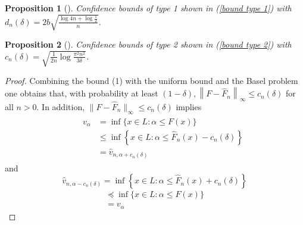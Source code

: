 \documentclass{article}
\theoremstyle{plain}
\newtheorem{prop}{Proposition}
\begin{document}
\begin{prop}[\textcite{cassel_general_2018}]
Confidence bounds of type 1 shown in (\ref{bound type 1}) with $d_n(\delta) = 2b \sqrt{\frac{\log 4n + \log \frac{1}{\delta}}{n}}$.

\end{prop}


\begin{prop}[\textcite{szorenyi_qualitative_nodate}] Confidence bounds of type 2 shown in (\ref{bound type 2}) with $c_n(\delta) = \sqrt{\frac{1}{2n} \log \frac{\pi^2 n^2}{3 \delta}}$. 
\end{prop}

\begin{proof}
 Combining the bound (1) with the uniform bound and the Basel problem one obtains that, with probability at least $(1-\delta),\left\|F-\widehat{F}_{n}\right\|_{\infty} \leq c_{n}(\delta)$ for all $n>0 .$ In addition, $\| F -\widehat{F}_{n} \|_{\infty} \leq c_{n}(\delta)$ implies\\
$$
\begin{aligned}
\qquad \begin{aligned}
v_\alpha &=\inf \{x \in L: \alpha \leq F(x)\} \\
& \leq \inf \left\{x \in L: \alpha \leq \widehat{F}_{n}(x)-c_{n}(\delta)\right\} \\
&=\widehat{v}_{n, \alpha+c_{n}(\delta)}
\end{aligned}
\end{aligned}
$$
and
$$
\widehat{v}_{n, \alpha-c_{n}(\delta)}=\inf \left\{x \in L: \alpha \leq \widehat{F}_{n}(x)+c_{n}(\delta)\right\}
$$
$$
\begin{array}{l}
\preceq \inf \{x \in L: \alpha \leq F(x)\} \\
=v_\alpha
\end{array}
$$
\end{proof}




\printbibliography
\end{document}
